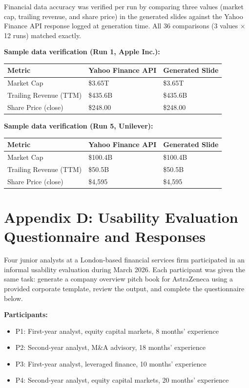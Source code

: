 Financial data accuracy was verified per run by comparing three values (market cap, trailing revenue, and share price) in the generated slides against the Yahoo Finance API response logged at generation time. All 36 comparisons (3 values $\times$ 12 runs) matched exactly.

\vspace{1em}
\noindent\textbf{Sample data verification (Run 1, Apple Inc.):}

\begin{tabular}{|l|l|l|}
\hline
\rowcolor{gray!20} \textbf{Metric} & \textbf{Yahoo Finance API} & \textbf{Generated Slide} \\
\hline
Market Cap & \$3.65T & \$3.65T \\
\hline
Trailing Revenue (TTM) & \$435.6B & \$435.6B \\
\hline
Share Price (close) & \$248.00 & \$248.00 \\
\hline
\end{tabular}

\vspace{1em}
\noindent\textbf{Sample data verification (Run 5, Unilever):}

\begin{tabular}{|l|l|l|}
\hline
\rowcolor{gray!20} \textbf{Metric} & \textbf{Yahoo Finance API} & \textbf{Generated Slide} \\
\hline
Market Cap & \$100.4B & \$100.4B \\
\hline
Trailing Revenue (TTM) & \$50.5B & \$50.5B \\
\hline
Share Price (close) & \$4,595 & \$4,595 \\
\hline
\end{tabular}

\newpage

\section*{Appendix D: Usability Evaluation Questionnaire and Responses}

Four junior analysts at a London-based financial services firm participated in an informal usability evaluation during March 2026. Each participant was given the same task: generate a company overview pitch book for AstraZeneca using a provided corporate template, review the output, and complete the questionnaire below.

\textbf{Participants:}
\begin{itemize}
    \item P1: First-year analyst, equity capital markets, 8 months' experience
    \item P2: Second-year analyst, M\&A advisory, 18 months' experience
    \item P3: First-year analyst, leveraged finance, 10 months' experience
    \item P4: Second-year analyst, equity capital markets, 20 months' experience
\end{itemize}

